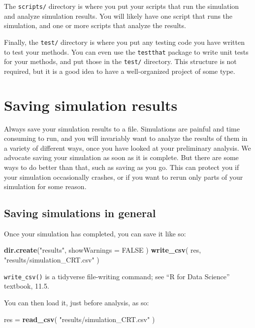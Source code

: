 \documentclass[
]{book}
\newenvironment{Shaded}{\begin{snugshade}}{\end{snugshade}}
\newcommand{\AttributeTok}[1]{\textcolor[rgb]{0.13,0.29,0.53}{#1}}
\newcommand{\ConstantTok}[1]{\textcolor[rgb]{0.56,0.35,0.01}{#1}}
\newcommand{\FunctionTok}[1]{\textcolor[rgb]{0.13,0.29,0.53}{\textbf{#1}}}
\newcommand{\NormalTok}[1]{#1}
\newcommand{\OtherTok}[1]{\textcolor[rgb]{0.56,0.35,0.01}{#1}}
\newcommand{\StringTok}[1]{\textcolor[rgb]{0.31,0.60,0.02}{#1}}
\begin{document}
The \texttt{scripts/} directory is where you put your scripts that run the simulation and analyze simulation results.
You will likely have one script that runs the simulation, and one or more scripts that analyze the results.

Finally, the \texttt{test/} directory is where you put any testing code you have written to test your methods.
You can even use the \texttt{testthat} package to write unit tests for your methods, and put those in the \texttt{test/} directory.
This structure is not required, but it is a good idea to have a well-organized project of some type.

\section{Saving simulation results}\label{saving-files}

Always save your simulation results to a file.
Simulations are painful and time consuming to run, and you will invariably want to analyze the results of them in a variety of different ways, once you have looked at your preliminary analysis.
We advocate saving your simulation as soon as it is complete.
But there are some ways to do better than that, such as saving as you go.
This can protect you if your simulation occasionally crashes, or if you want to rerun only parts of your simulation for some reason.

\subsection{Saving simulations in general}\label{saving-simulations-in-general}

Once your simulation has completed, you can save it like so:

\begin{Shaded}
\begin{Highlighting}[]
\FunctionTok{dir.create}\NormalTok{(}\StringTok{"results"}\NormalTok{, }\AttributeTok{showWarnings =} \ConstantTok{FALSE}\NormalTok{ )}
\FunctionTok{write\_csv}\NormalTok{( res, }\StringTok{"results/simulation\_CRT.csv"}\NormalTok{ )}
\end{Highlighting}
\end{Shaded}

\texttt{write\_csv()} is a tidyverse file-writing command; see ``R for Data Science''
textbook, 11.5.

You can then load it, just before analysis, as so:

\begin{Shaded}
\begin{Highlighting}[]
\NormalTok{res }\OtherTok{=} \FunctionTok{read\_csv}\NormalTok{( }\StringTok{"results/simulation\_CRT.csv"}\NormalTok{ )}
\end{Highlighting}
\end{Shaded}
\end{document}
